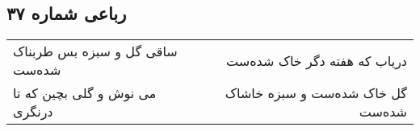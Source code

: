 \begin{center}
\section*{رباعی شماره ۳۷}
\label{sec:sh037}
\begin{longtable}{l p{0.5cm} r}
ساقی گل و سبزه بس طربناک شده‌ست
&&
دریاب که هفته دگر خاک شده‌ست
\\
می نوش و گلی بچین که تا درنگری
&&
گل خاک شده‌ست و سبزه خاشاک شده‌ست
\\
\end{longtable}
\end{center}
